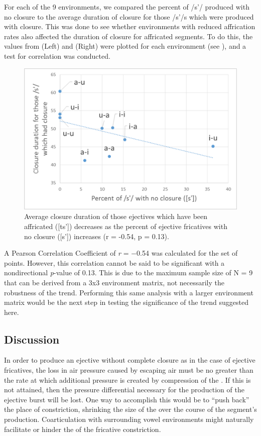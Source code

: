 \documentclass[output=paper,newtxmath,modfonts,nonflat,final]{langsci/langscibook}
\begin{document}
For each of the 9 environments, we compared the percent of /s’/ produced with no closure to the average duration of closure for those /s’/s which were produced with closure. This was done to see whether environments with reduced affrication rates also affected the duration of closure for affricated segments. To do this, the values from  (Left) and  (Right) were plotted for each environment (see ), and a test for correlation was conducted.

 


\begin{figure}
\includegraphics[height=0.3\textheight]{figures/fig-moeng-2.png}
\caption{Average closure duration of those ejectives which have been affricated ([ts’]) decreases as the percent of ejective fricatives with no closure ([s’]) increases (r = -0.54, p = 0.13).}
\label{fig:moeng:3}
\end{figure}

\newpage 
A Pearson Correlation Coefficient of \textit{r} = −0.54 was calculated for the set of points. However, this correlation cannot be said to be significant with a nondirectional \textit{p}{}-value of 0.13. This is due to the maximum sample size of N = 9 that can be derived from a 3x3 environment matrix, not necessarily the robustness of the trend. Performing this same analysis with a larger environment matrix would be the next step in testing the significance of the trend suggested here.

\subsection{Discussion}\label{sec:moeng:5.4}

In order to produce an ejective without complete closure as in the case of ejective fricatives, the loss in air pressure caused by escaping air must be no greater than the rate at which additional pressure is created by compression of the . If this is not attained, then the pressure differential necessary for the production of the ejective burst will be lost. One way to accomplish this would be to “push back” the place of constriction, shrinking the size of the  over the course of the segment’s production. Coarticulation with surrounding vowel environments might naturally facilitate or hinder the  of the fricative constriction. 
\end{document}
